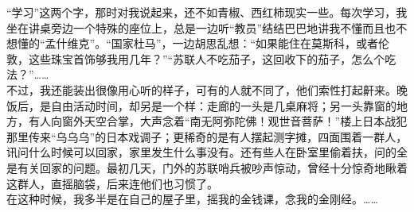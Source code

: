 “学习”这两个字，那时对我说起来，还不如青椒、西红柿现实一些。每次学习，我坐在讲桌旁边一个特殊的座位上，总是一边听“教员”结结巴巴地讲我不懂而且也不想懂的“孟什维克”。“国家杜马”，一边胡思乱想：“如果能住在莫斯科，或者伦敦，这些珠宝首饰够我用几年？”“苏联人不吃茄子，这回收下的茄子，怎么个吃法？”……\\

不过，我还能装出很像用心听的样子，可有的人就不同了，他们索性打起鼾来。晚饭后，是自由活动时间，却另是一个样：走廊的一头是几桌麻将；另一头靠窗的地方，有人向窗外天空合掌，大声念着“南无阿弥陀佛！观世音菩萨！”楼上日本战犯那里传来“乌乌乌”的日本戏调子；更稀奇的是有人摆起测字摊，四面围着一群人，讯问什么时候可以回家，家里发生什么事没有。还有些人在卧室里偷着扶，问的全是有关回家的问题。最初几天，门外的苏联哨兵被吵声惊动，曾经十分惊奇地瞅着这群人，直摇脑袋，后来连他们也习惯了。\\

在这种时候，我多半是在自己的屋子里，摇我的金钱课，念我的金刚经。……
